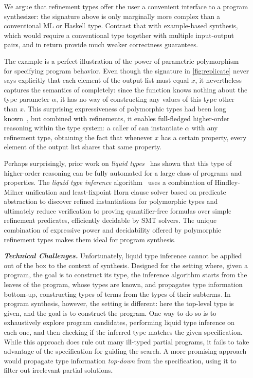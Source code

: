 \documentclass[10pt,preprint]{sigplanconf-pldi16}
\theoremstyle{definition}
\newcommand{\custompar}[1]{\parskip 0pt \textbf{\textit{#1}}}
\begin{document}
We argue that refinement types offer the user a convenient interface to a program synthesizer:
the signature above is only marginally more complex than a conventional ML or Haskell type.
Contrast that with example-based synthesis,
which would require a conventional type together with multiple input-output pairs,
and in return provide much weaker correctness guarantees.

The  example is a perfect illustration of the power of parametric polymorphism for specifying program behavior.
Even though the signature in \autoref{fig:replicate} never says explicitly that each element of the output list must equal $x$,
it nevertheless captures the semantics of  completely:
since the function knows nothing about the type parameter $\alpha$,
it has no way of constructing any values of this type other than $x$.
This surprising expressiveness of polymorphic types had been long known~\cite{Wadler89},
but combined with refinements, it enables full-fledged higher-order reasoning within the type system:
a caller of  can instantiate $\alpha$ with any refinement type,
obtaining the fact that whenever $x$ has a certain property, every element of the output list shares that same property.

Perhaps surprisingly, prior work on \emph{liquid types}~\cite{RondonKaJh08,KawaguchiRoJh09,VazouRoJh13,VazouSeJh14} has shown that
this type of higher-order reasoning can be fully automated for a large class of programs and properties.
The \emph{liquid type inference} algorithm~\cite{RondonKaJh08}
uses a combination of Hindley-Milner unification and least-fixpoint Horn clause solver based on predicate abstraction
to discover refined instantiations for polymorphic types 
and ultimately reduce verification to proving quantifier-free formulas over simple refinement predicates,
efficiently decidable by SMT solvers.
The unique combination of expressive power and decidability offered by polymorphic refinement types
makes them ideal for program synthesis.

\custompar{Technical Challenges.}
Unfortunately, liquid type inference cannot be applied out of the box to the context of synthesis.
Designed for the setting where, given a program, the goal is to construct its type,
the inference algorithm starts from the leaves of the program, whose types are known,
and propagates type information bottom-up, 
constructing types of terms from the types of their subterms.
In program synthesis, however, the setting is different:
here the top-level type is given, and the goal is to construct the program.
One way to do so is to exhaustively explore program candidates,
performing liquid type inference on each one,
and then checking if the inferred type matches the given specification.
While this approach does rule out many ill-typed partial programs,
it fails to take advantage of the specification for guiding the search.
A more promising approach would propagate type information \emph{top-down} from the specification, 
using it to filter out irrelevant partial solutions.
\end{document}
